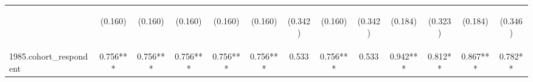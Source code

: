 \begin{center}
\begin{tabular}{lcccccccccccc}
\vspace{4pt} & \begin{footnotesize}(0.160)\end{footnotesize} & \begin{footnotesize}(0.160)\end{footnotesize} & \begin{footnotesize}(0.160)\end{footnotesize} & \begin{footnotesize}(0.160)\end{footnotesize} & \begin{footnotesize}(0.160)\end{footnotesize} & \begin{footnotesize}(0.342)\end{footnotesize} & \begin{footnotesize}(0.160)\end{footnotesize} & \begin{footnotesize}(0.342)\end{footnotesize} & \begin{footnotesize}(0.184)\end{footnotesize} & \begin{footnotesize}(0.323)\end{footnotesize} & \begin{footnotesize}(0.184)\end{footnotesize} & \begin{footnotesize}(0.346)\end{footnotesize} \\
1985.cohort\_respondent & 0.756*** & 0.756*** & 0.756*** & 0.756*** & 0.756*** & 0.533 & 0.756*** & 0.533 & 0.942*** & 0.812** & 0.867*** & 0.782** \\

\end{tabular}
\end{center}

